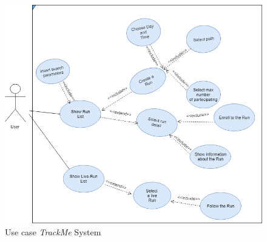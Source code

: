 \begin{figure}[H]
    \centering
    \includegraphics[scale=0.4]{rasdL/Pictures/run.png}
    \caption{Use case  \emph{TrackMe} System}
\end{figure}